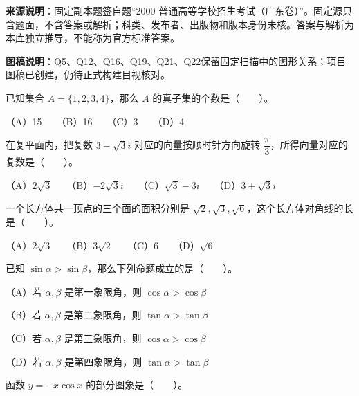 

\begin{gktip}
\textbf{来源说明}：固定副本题签自题“2000 普通高等学校招生考试（广东卷）”。固定源只含题面，不含答案或解析；科类、发布者、出版物和版本身份未核。答案与解析为本库独立推导，不能称为官方标准答案。

\textbf{图稿说明}：Q5、Q12、Q16、Q19、Q21、Q22保留固定扫描中的图形关系；项目图稿已创建，仍待正式构建目视核对。
\end{gktip}


\begin{question}
已知集合 $A=\{1,2,3,4\}$，那么 $A$ 的真子集的个数是\mbox{（　　）}。

（A）15　　（B）16　　（C）3　　（D）4

\end{question}
\begin{question}
在复平面内，把复数 $3-\sqrt{3}i$ 对应的向量按顺时针方向旋转 $\dfrac{\pi}{3}$，所得向量对应的复数是\mbox{（　　）}。

（A）$2\sqrt{3}$　　（B）$-2\sqrt{3}i$　　（C）$\sqrt{3}-3i$　　（D）$3+\sqrt{3}i$

\end{question}
\begin{question}
一个长方体共一顶点的三个面的面积分别是 $\sqrt{2},\sqrt{3},\sqrt{6}$，这个长方体对角线的长是\mbox{（　　）}。

（A）$2\sqrt{3}$　　（B）$3\sqrt{2}$　　（C）$6$　　（D）$\sqrt{6}$

\end{question}
\begin{question}
已知 $\sin\alpha>\sin\beta$，那么下列命题成立的是\mbox{（　　）}。

（A）若 $\alpha,\beta$ 是第一象限角，则 $\cos\alpha>\cos\beta$

（B）若 $\alpha,\beta$ 是第二象限角，则 $\tan\alpha>\tan\beta$

（C）若 $\alpha,\beta$ 是第三象限角，则 $\cos\alpha>\cos\beta$

（D）若 $\alpha,\beta$ 是第四象限角，则 $\tan\alpha>\tan\beta$

\Needspace{0.4\textheight}
\end{question}
\begin{question}
函数 $y=-x\cos x$ 的部分图象是\mbox{（　　）}。
\nopagebreak[4]
\begin{center}\end{center}
\nopagebreak[4]
\end{question}
